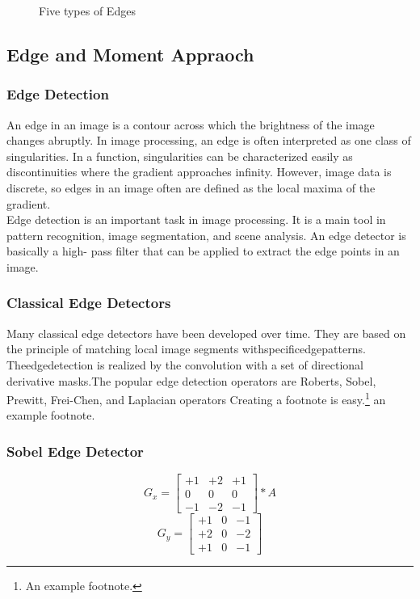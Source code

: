 \begin{itemize}
\begin{figure}[htp]
  \caption{Five types of Edges}
  \label{ehd}
\end{figure}
\end{itemize}


\subsection {Edge and Moment Appraoch}

\subsubsection{Edge Detection}
An edge in an image is a contour across which the brightness of the image changes abruptly.
In image processing, an edge is often interpreted as one class of singularities. In a function,
singularities can be characterized easily as discontinuities where the gradient approaches
infinity. However, image data is discrete, so edges in an image often are defined as the
local maxima of the gradient.
\\
Edge detection is an important task in image processing. It is a main tool in pattern
recognition, image segmentation, and scene analysis. An edge detector is basically a high-
pass filter that can be applied to extract the edge points in an image.

\subsubsection{Classical Edge Detectors}
Many classical edge detectors have been developed over time. They are based on the
principle of matching local image segments withspecificedgepatterns. Theedgedetection
is realized by the convolution with a set of directional derivative masks.The popular edge detection operators are Roberts, Sobel, Prewitt, Frei-Chen, and Laplacian operators
Creating a footnote is easy.\footnote{An example footnote.}  	an example footnote.
\subsubsection{Sobel Edge Detector}

\[
G_{x}=
 \begin{bmatrix}
  +1 &+2 &+1 \\
  0 & 0 & 0 \\
  -1 & -2 & -1
 \end{bmatrix} *A
\]
\[
G_{y}=
 \begin{bmatrix}
  +1 & 0 & -1 \\
  +2 & 0 & -2 \\
  +1 & 0 & -1
 \end{bmatrix}
\]

